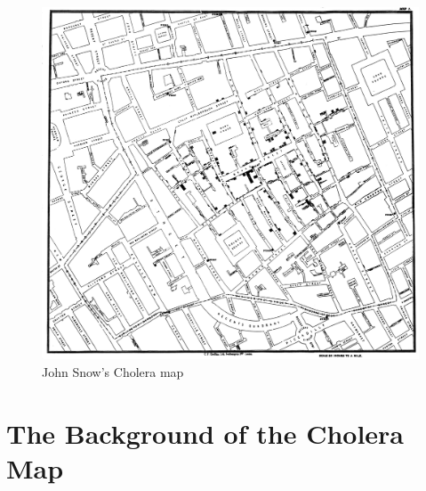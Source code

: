 \documentclass[12pt]{article}
\begin{document}
\begin{figure}
\centering
\includegraphics[scale=0.1]{Snow-cholera-map-1}
\caption{John Snow's Cholera map}
\label{fig:snow}
\end{figure}


\section{The Background of the Cholera Map}
\end{document}
